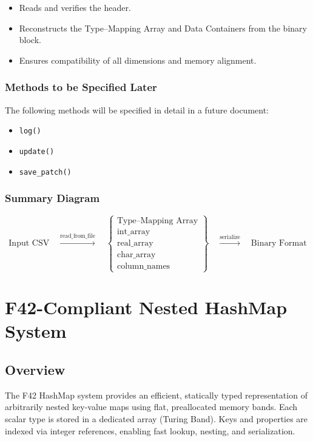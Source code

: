 \documentclass{article}
\begin{document}
\begin{itemize}
    \item Reads and verifies the header.
    \item Reconstructs the Type--Mapping Array and Data Containers from the binary block.
    \item Ensures compatibility of all dimensions and memory alignment.
\end{itemize}

\subsubsection{Methods to be Specified Later}

The following methods will be specified in detail in a future document:

\begin{itemize}
    \item \texttt{log()}
    \item \texttt{update()}
    \item \texttt{save\_patch()}
\end{itemize}

\subsubsection{Summary Diagram}

\[
\text{Input CSV}
\quad \xrightarrow{\text{read\_from\_file}} \quad
\left\{
\begin{array}{l}
\text{Type--Mapping Array} \\
\text{int\_array} \\
\text{real\_array} \\
\text{char\_array} \\
\text{column\_names}
\end{array}
\right\}
\quad \xrightarrow{\text{serialize}} \quad
\text{Binary Format}
\]

\section{F42-Compliant Nested HashMap System}

\subsection{Overview}

The F42 HashMap system provides an efficient, statically typed representation of arbitrarily nested key-value maps using flat, preallocated memory bands. Each scalar type is stored in a dedicated array (Turing Band). Keys and properties are indexed via integer references, enabling fast lookup, nesting, and serialization.
\end{document}
